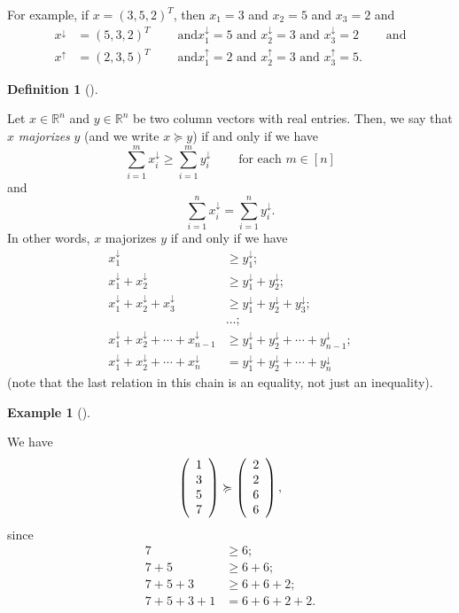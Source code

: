 \documentclass[numbers=enddot,12pt,final,onecolumn,notitlepage]{scrartcl}%
\numberwithin{exer}{subsection}
\theoremstyle{definition}
\newtheorem{defi}[theo]{Definition}
\newenvironment{definition}[1][]
{\begin{defi}[#1]\begin{leftbar}}
{\end{leftbar}\end{defi}}
\newtheorem{exam}[theo]{Example}
\newenvironment{example}[1][]
{\begin{exam}[#1]\begin{leftbar}}
{\end{leftbar}\end{exam}}
\let\sumnonlimits\sum
\renewcommand{\sum}{\sumnonlimits\limits}
\begin{document}
For example, if $x=\left(  3,5,2\right)  ^{T}$, then $x_{1}=3$ and $x_{2}=5$
and $x_{3}=2$ and%
\begin{align*}
x^{\downarrow}  &  =\left(  5,3,2\right)  ^{T}\ \ \ \ \ \ \ \ \ \ \text{and
}x_{1}^{\downarrow}=5\text{ and }x_{2}^{\downarrow}=3\text{ and }%
x_{3}^{\downarrow}=2\ \ \ \ \ \ \ \ \ \ \text{and}\\
x^{\uparrow}  &  =\left(  2,3,5\right)  ^{T}\ \ \ \ \ \ \ \ \ \ \text{and
}x_{1}^{\uparrow}=2\text{ and }x_{2}^{\uparrow}=3\text{ and }x_{3}^{\uparrow
}=5.
\end{align*}


\begin{definition}
\label{def.major.major}Let $x\in\mathbb{R}^{n}$ and $y\in\mathbb{R}^{n}$ be
two column vectors with real entries. Then, we say that $x$ \emph{majorizes}
$y$ (and we write $x\succcurlyeq y$) if and only if we have%
\[
\sum_{i=1}^{m}x_{i}^{\downarrow}\geq\sum_{i=1}^{m}y_{i}^{\downarrow
}\ \ \ \ \ \ \ \ \ \ \text{for each }m\in\left[  n\right]
\]
and%
\[
\sum_{i=1}^{n}x_{i}^{\downarrow}=\sum_{i=1}^{n}y_{i}^{\downarrow}.
\]
In other words, $x$ majorizes $y$ if and only if we have%
\begin{align*}
x_{1}^{\downarrow}  &  \geq y_{1}^{\downarrow};\\
x_{1}^{\downarrow}+x_{2}^{\downarrow}  &  \geq y_{1}^{\downarrow}%
+y_{2}^{\downarrow};\\
x_{1}^{\downarrow}+x_{2}^{\downarrow}+x_{3}^{\downarrow}  &  \geq
y_{1}^{\downarrow}+y_{2}^{\downarrow}+y_{3}^{\downarrow};\\
&  \ldots;\\
x_{1}^{\downarrow}+x_{2}^{\downarrow}+\cdots+x_{n-1}^{\downarrow}  &  \geq
y_{1}^{\downarrow}+y_{2}^{\downarrow}+\cdots+y_{n-1}^{\downarrow};\\
x_{1}^{\downarrow}+x_{2}^{\downarrow}+\cdots+x_{n}^{\downarrow}  &
=y_{1}^{\downarrow}+y_{2}^{\downarrow}+\cdots+y_{n}^{\downarrow}%
\end{align*}
(note that the last relation in this chain is an equality, not just an inequality).
\end{definition}

\begin{example}
We have%
\[
\left(
\begin{array}
[c]{c}%
1\\
3\\
5\\
7
\end{array}
\right)  \succcurlyeq\left(
\begin{array}
[c]{c}%
2\\
2\\
6\\
6
\end{array}
\right)  ,
\]
since%
\begin{align*}
7  &  \geq6;\\
7+5  &  \geq6+6;\\
7+5+3  &  \geq6+6+2;\\
7+5+3+1  &  =6+6+2+2.
\end{align*}

\end{example}
\end{document}
